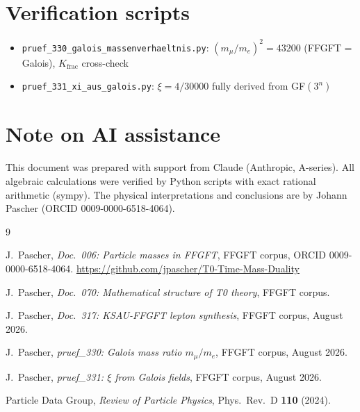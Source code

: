 \section*{Verification scripts}

\begin{itemize}
  \item \texttt{pruef\_330\_galois\_massenverhaeltnis.py}:
    $(m_\mu/m_e)^2 = 43200$ (FFGFT = Galois), $K_\text{frac}$ cross-check
  \item \texttt{pruef\_331\_xi\_aus\_galois.py}:
    $\xi = 4/30000$ fully derived from GF$(3^n)$
\end{itemize}

\section*{Note on AI assistance}

This document was prepared with support from Claude (Anthropic, A-series).
All algebraic calculations were verified by Python scripts with exact rational
arithmetic (sympy). The physical interpretations and conclusions are by
Johann Pascher (ORCID 0009-0000-6518-4064).

\begin{thebibliography}{9}

J.~Pascher,
\textit{Doc.~006: Particle masses in FFGFT},
FFGFT corpus, ORCID 0009-0000-6518-4064.
\url{https://github.com/jpascher/T0-Time-Mass-Duality}

J.~Pascher,
\textit{Doc.~070: Mathematical structure of T0 theory},
FFGFT corpus.

J.~Pascher,
\textit{Doc.~317: KSAU-FFGFT lepton synthesis},
FFGFT corpus, August 2026.

J.~Pascher,
\textit{pruef\_330: Galois mass ratio $m_\mu/m_e$},
FFGFT corpus, August 2026.

J.~Pascher,
\textit{pruef\_331: $\xi$ from Galois fields},
FFGFT corpus, August 2026.

Particle Data Group,
\textit{Review of Particle Physics},
Phys.\ Rev.\ D \textbf{110} (2024).

\end{thebibliography}
